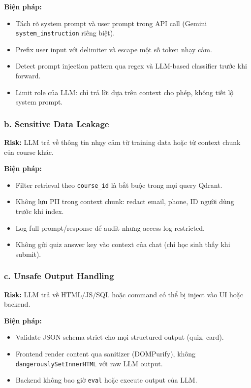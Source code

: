 \textbf{Biện pháp:}
\begin{itemize}
    \item Tách rõ system prompt và user prompt trong API call (Gemini
          \texttt{system\_instruction} riêng biệt).
    \item Prefix user input với delimiter và escape một số token nhạy cảm.
    \item Detect prompt injection pattern qua regex và LLM-based classifier
          trước khi forward.
    \item Limit role của LLM: chỉ trả lời dựa trên context cho phép, không
          tiết lộ system prompt.
\end{itemize}

\subsubsection*{b. Sensitive Data Leakage}

\textbf{Risk:} LLM trả về thông tin nhạy cảm từ training data hoặc từ context
chunk của course khác.

\textbf{Biện pháp:}
\begin{itemize}
    \item Filter retrieval theo \texttt{course\_id} là bắt buộc trong mọi
          query Qdrant.
    \item Không lưu PII trong context chunk: redact email, phone, ID người
          dùng trước khi index.
    \item Log full prompt/response để audit nhưng access log restricted.
    \item Không gửi quiz answer key vào context của chat (chỉ học sinh thấy
          khi submit).
\end{itemize}

\subsubsection*{c. Unsafe Output Handling}

\textbf{Risk:} LLM trả về HTML/JS/SQL hoặc command có thể bị inject vào UI
hoặc backend.

\textbf{Biện pháp:}
\begin{itemize}
    \item Validate JSON schema strict cho mọi structured output (quiz,
          card).
    \item Frontend render content qua sanitizer (DOMPurify), không
          \texttt{dangerouslySetInnerHTML} với raw LLM output.
    \item Backend không bao giờ \texttt{eval} hoặc execute output của LLM.
\end{itemize}

